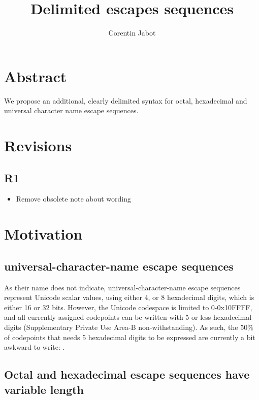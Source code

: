 \documentclass{wg21}
\title{Delimited escapes sequences}
\author{Corentin Jabot}{corentin.jabot@gmail.com}
\begin{document}
\maketitle

\paperquote{}

\section{Abstract}

We propose an additional, clearly delimited syntax for octal, hexadecimal and universal character name escape sequences.

\section{Revisions}

\subsection{R1}
\begin{itemize}
\item Remove obsolete note about wording
\end{itemize}

\section{Motivation}

\subsection{universal-character-name escape sequences}

As their name does not indicate, universal-character-name escape sequences represent Unicode scalar values,
using either 4, or 8 hexadecimal digits, which is either 16 or 32 bits.
However, the Unicode codespace is limited to 0-0x10FFFF, and all currently assigned codepoints can be written with 5 or less
hexadecimal digits (Supplementary Private Use Area-B non-withstanding).
As such, the \~50\% of codepoints that needs 5 hexadecimal digits to be expressed are currently a bit awkward to write: .

\subsection{Octal and hexadecimal escape sequences have variable length}
\end{document}
